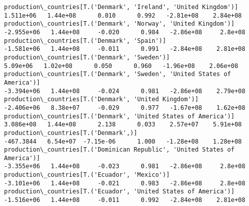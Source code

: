 \documentclass[11pt]{article}
\begin{document}
\begin{Verbatim}[commandchars=\\\{\}]
production\_countries[T.('Denmark', 'Ireland', 'United Kingdom')]                                                                                                                       1.511e+06   1.44e+08      0.010      0.992   -2.81e+08    2.84e+08
production\_countries[T.('Denmark', 'Norway', 'United Kingdom')]                                                                                                                       -2.955e+06   1.44e+08     -0.020      0.984   -2.86e+08     2.8e+08
production\_countries[T.('Denmark', 'Spain')]                                                                                                                                          -1.581e+06   1.44e+08     -0.011      0.991   -2.84e+08    2.81e+08
production\_countries[T.('Denmark', 'Sweden')]                                                                                                                                           5.09e+06   1.02e+08      0.050      0.960   -1.96e+08    2.06e+08
production\_countries[T.('Denmark', 'Sweden', 'United States of America')]                                                                                                             -3.394e+06   1.44e+08     -0.024      0.981   -2.86e+08    2.79e+08
production\_countries[T.('Denmark', 'United Kingdom')]                                                                                                                                 -2.406e+06   8.38e+07     -0.029      0.977   -1.67e+08    1.62e+08
production\_countries[T.('Denmark', 'United States of America')]                                                                                                                        3.086e+08   1.44e+08      2.138      0.033    2.57e+07    5.91e+08
production\_countries[T.('Denmark',)]                                                                                                                                                   -467.3844   6.54e+07  -7.15e-06      1.000   -1.28e+08    1.28e+08
production\_countries[T.('Dominican Republic', 'United States of America')]                                                                                                            -3.355e+06   1.44e+08     -0.023      0.981   -2.86e+08     2.8e+08
production\_countries[T.('Ecuador', 'Mexico')]                                                                                                                                         -3.101e+06   1.44e+08     -0.021      0.983   -2.86e+08     2.8e+08
production\_countries[T.('Ecuador', 'United States of America')]                                                                                                                       -1.516e+06   1.44e+08     -0.011      0.992   -2.84e+08    2.81e+08

\end{Verbatim}
\end{document}

